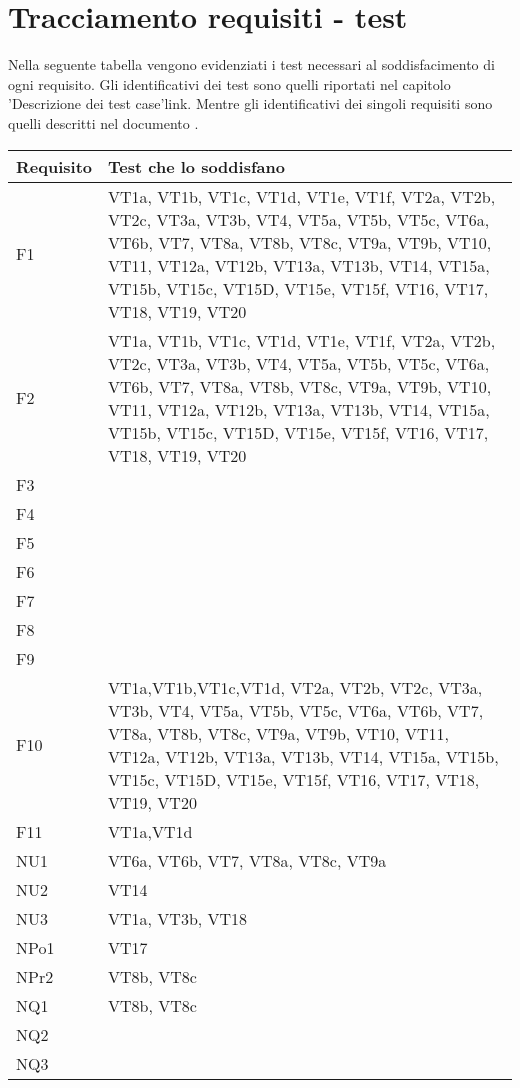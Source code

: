 \section{Tracciamento requisiti - test}
Nella seguente tabella vengono evidenziati i test necessari al soddisfacimento di ogni requisito. Gli identificativi dei test sono quelli riportati nel capitolo 'Descrizione dei test case'{link}. Mentre gli identificativi dei singoli requisiti sono quelli descritti nel documento \AR .
 \begin{center}
\begin{tabular}{|p{3cm}|p{8cm}|} \hline
\textbf{Requisito} & \textbf{Test che lo soddisfano}\\ \hline
F1  & VT1a, VT1b, VT1c, VT1d, VT1e, VT1f, VT2a, VT2b, VT2c, VT3a, VT3b, VT4, VT5a, VT5b, VT5c, VT6a, VT6b, VT7, VT8a, VT8b, VT8c, VT9a, VT9b, VT10, VT11, VT12a, VT12b, VT13a, VT13b, VT14, VT15a, VT15b, VT15c, VT15D, VT15e, VT15f, VT16, VT17, VT18, VT19, VT20\\ \hline
F2  &  VT1a, VT1b, VT1c, VT1d, VT1e, VT1f, VT2a, VT2b, VT2c, VT3a, VT3b, VT4, VT5a, VT5b, VT5c, VT6a, VT6b, VT7, VT8a, VT8b, VT8c, VT9a, VT9b, VT10, VT11, VT12a, VT12b, VT13a, VT13b, VT14, VT15a, VT15b, VT15c, VT15D, VT15e, VT15f, VT16, VT17, VT18, VT19, VT20\\ \hline
F3  &  \\ \hline
F4  &  \\ \hline
F5  &  \\ \hline
F6  &  \\ \hline
F7  &  \\ \hline
F8  &  \\ \hline
F9  &  \\ \hline
F10 & VT1a,VT1b,VT1c,VT1d, VT2a, VT2b, VT2c, VT3a, VT3b, VT4, VT5a, VT5b, VT5c, VT6a, VT6b, VT7, VT8a, VT8b, VT8c, VT9a, VT9b, VT10, VT11, VT12a, VT12b, VT13a, VT13b, VT14, VT15a, VT15b, VT15c, VT15D, VT15e, VT15f, VT16, VT17, VT18, VT19, VT20 \\ \hline
F11 & VT1a,VT1d \\ \hline
NU1 &  VT6a, VT6b, VT7, VT8a, VT8c, VT9a\\ \hline
NU2 &  VT14\\ \hline
NU3 &  VT1a, VT3b, VT18\\ \hline
NPo1 &  VT17\\ \hline
NPr2 &  VT8b, VT8c\\ \hline
NQ1 & VT8b, VT8c  \\ \hline
NQ2 &  \\ \hline
NQ3 &  \\ \hline


\end{tabular} \\
\end{center}



